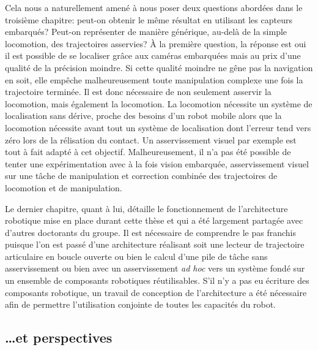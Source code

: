 Cela nous a naturellement amené à nous poser deux questions abordées
dans le troisième chapitre: peut-on obtenir le même résultat en
utilisant les capteurs embarqués? Peut-on représenter de manière
générique, au-delà de la simple locomotion, des trajectoires
asservies? À la première question, la réponse est oui il est possible
de se localiser grâce aux caméras embarquées mais au prix d'une
qualité de la précision moindre. Si cette qualité moindre ne gêne pas
la navigation en soit, elle empêche malheureusement toute manipulation
complexe une fois la trajectoire terminée. Il est donc nécessaire de
non seulement asservir la locomotion, mais également la locomotion. La
locomotion nécessite un système de localisation sans dérive, proche
des besoins d'un robot mobile alors que la locomotion nécessite avant
tout un système de localisation dont l'erreur tend vers zéro lors de
la rélisation du contact. Un asservissement visuel par exemple est
tout à fait adapté à cet objectif. Malheureusement, il n'a pas été
possible de tenter une expérimentation avec à la fois vision
embarquée, asservissement visuel sur une tâche de manipulation et
correction combinée des trajectoires de locomotion et de manipulation.


Le dernier chapitre, quant à lui, détaille le fonctionnement de
l'architecture robotique mise en place durant cette thèse et qui a été
largement partagée avec d'autres doctorants du groupe. Il est
nécessaire de comprendre le pas franchis puisque l'on est passé d'une
architecture réalisant soit une lecteur de trajectoire articulaire en
boucle ouverte ou bien le calcul d'une pile de tâche sans
asservissement ou bien avec un asservissement \emph{ad hoc} vers un
système fondé sur un ensemble de composants robotiques
réutilisables. S'il n'y a pas eu écriture des composants robotique, un
travail de conception de l'architecture a été nécessaire afin de
permettre l'utilisation conjointe de toutes les capacités du robot.



\subsection{\ldots et perspectives}



